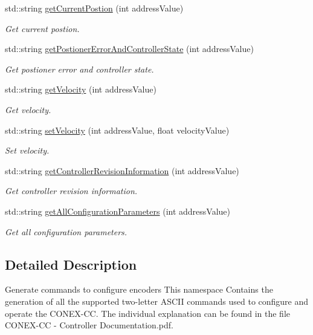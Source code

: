 \begin{DoxyCompactItemize}
std\+::string \hyperlink{namespaceconex_abc96926292153eb7b8268a340eb140fc}{get\+Current\+Postion} (int address\+Value)
\begin{DoxyCompactList}\small\item\em Get current postion. \end{DoxyCompactList}\item 
std\+::string \hyperlink{namespaceconex_ab160c5ab9d6870ec2fdf198fede98ebd}{get\+Postioner\+Error\+And\+Controller\+State} (int address\+Value)
\begin{DoxyCompactList}\small\item\em Get postioner error and controller state. \end{DoxyCompactList}\item 
std\+::string \hyperlink{namespaceconex_ab53c181f980eccedaa79f3b0154755df}{get\+Velocity} (int address\+Value)
\begin{DoxyCompactList}\small\item\em Get velocity. \end{DoxyCompactList}\item 
std\+::string \hyperlink{namespaceconex_aa970ffa1a5a264c97b5e821e1dedf0f0}{set\+Velocity} (int address\+Value, float velocity\+Value)
\begin{DoxyCompactList}\small\item\em Set velocity. \end{DoxyCompactList}\item 
std\+::string \hyperlink{namespaceconex_a0eb1fa3646288f0387cb303f0d8f71df}{get\+Controller\+Revision\+Information} (int address\+Value)
\begin{DoxyCompactList}\small\item\em Get controller revision information. \end{DoxyCompactList}\item 
std\+::string \hyperlink{namespaceconex_a7480495275a9236b221d635dd5bc08f8}{get\+All\+Configuration\+Parameters} (int address\+Value)
\begin{DoxyCompactList}\small\item\em Get all configuration parameters. \end{DoxyCompactList}\end{DoxyCompactItemize}


\subsection{Detailed Description}
Generate commands to configure encoders This namespace Contains the generation of all the supported two-\/letter A\+S\+C\+II commands used to configure and operate the C\+O\+N\+E\+X-\/\+CC. The individual explanation can be found in the file \textquotesingle{}C\+O\+N\+E\+X-\/\+CC -\/ Controller Documentation.\+pdf\textquotesingle{}. 

